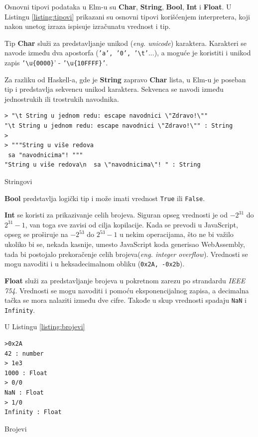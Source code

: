 \documentclass[12pt,oneside]{memoir}
\begin{document}
Osnovni tipovi podataka u Elm-u su \textbf{Char}, \textbf{String}, \textbf{Bool}, \textbf{Int} i \textbf{Float}. U Listingu \ref{listing:tipovi} prikazani su osnovni tipovi korišćenjem interpretera, koji nakon unetog izraza ispisuje izračunatu vrednost i tip. 

Tip \textbf{Char} služi za predstavljanje unikod (\emph{eng. unicode}) karaktera. Karakteri se navode između dva apostorfa (\texttt{'a', '0', '\textbackslash t'}...), a moguće je koristiti i unikod zapis  \texttt{'\textbackslash u\{0000\}}' - \texttt{'\textbackslash u\{10FFFF\}'}.

Za razliku od Haskell-a, gde je \textbf{String} zapravo \textbf{Char} lista, u Elm-u je poseban tip i predstavlja sekvencu unikod karaktera. Sekvenca se navodi između jednostrukih ili trostrukih navodnika. 
\begin{listing}[ht]
\begin{verbatim}
> "\t String u jednom redu: escape navodnici \"Zdravo!\""
"\t String u jednom redu: escape navodnici \"Zdravo!\"" : String
>
> """String u više redova
 sa "navodnicima"! """
"String u više redova\n  sa \"navodnicima\"! " : String
\end{verbatim}
\caption{Stringovi}
\label{listing:string}
\end{listing}

\textbf{Bool} predstavlja logički tip i može imati vrednost \texttt{True} ili \texttt{False}. 

\textbf{Int} se koristi za prikazivanje celih brojeva. Siguran opseg vrednosti je od \(-2^{31}\) do \(2^{31} - 1\), van toga sve zavisi od cilja kopilacije. Kada se prevodi u JavaScript, opseg se proširuje na \(-2^{53}\) do \(2^{53} - 1\) u nekim operacijama, što ne bi važilo ukoliko bi se, nekada kasnije, umesto JavaScript koda generisao WebAssembly, tada bi postojalo prekoračenje celih brojeva(\emph{eng. integer overflow}). Vrednosti se mogu navoditi i u heksadecimalnom obliku  (\texttt{0x2A, -0x2b}).

\textbf{Float} služi za predstavljanje brojeva u pokretnom zarezu po strandardu \emph{IEEE 754}. Vrednosti se mogu navoditi i pomoću eksponencijalnog zapisa, a decimalna tačka se mora nalaziti između dve cifre. Takođe u skup vrednosti spadaju  \texttt{NaN} i \texttt{Infinity}.

U Listingu \ref{listing:brojevi} 
\begin{listing}[ht]
\begin{verbatim}
>0x2A
42 : number
> 1e3
1000 : Float
> 0/0 
NaN : Float
> 1/0 
Infinity : Float
\end{verbatim}
\caption{Brojevi}
\label{listing:brojevi}
\end{listing}
\end{document}
